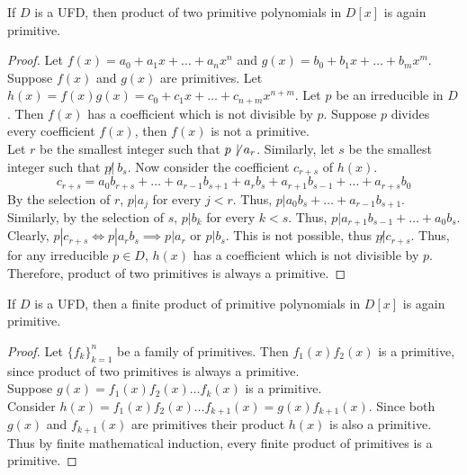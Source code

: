 \begin{lemma}[Gauss]
	If $D$ is a UFD, then product of two primitive polynomials in $D[x]$ is again primitive.
\end{lemma}
\begin{proof}
	Let $f(x) = a_0 + a_1x + \dots + a_nx^n$ and $g(x) = b_0 + b_1x + \dots + b_mx^m$.
	Suppose $f(x)$ and $g(x)$ are primitives.
	Let $h(x) = f(x)g(x) = c_0 + c_1x + \dots + c_{n+m}x^{n+m}$.
	Let $p$ be an irreducible in $D$.
	Then $f(x)$ has a coefficient which is not divisible by $p$.
	Suppose $p$ divides every coefficient $f(x)$, then $f(x)$ is not a primitive.\\

	Let $r$ be the smallest integer such that $p\not\!|\ a_r$.
	Similarly, let $s$ be the smallest integer such that $p\not|\ b_s$.
	Now consider the coefficient $c_{r+s}$ of $h(x)$.
	$$ c_{r+s} = a_0b_{r+s}+\dots+a_{r-1}b_{s+1}+a_rb_s+a_{r+1}b_{s-1}+\dots+a_{r+s}b_0$$
	By the selection of $r$, $p | a_j$ for every $j < r$.
	Thus, $p | a_0b_s+\dots+a_{r-1}b_{s+1}$.
	Similarly, by the selection of $s$, $p | b_k$ for every $k < s$.
	Thus, $p | a_{r+1}b_{s-1}+\dots+a_0b_s$.
	Clearly, $p | c_{r+s} \iff p | a_rb_s \implies p|a_r \text{ or } p|b_s$.
	This is not possible, thus $p \not| c_{r+s}$.	
	Thus, for any irreducible $p \in D$, $h(x)$ has a coefficient which is not divisible by $p$.
	Therefore, product of two primitives is always a primitive.
\end{proof}

\begin{corollary}
	If $D$ is a UFD, then a finite product of primitive polynomials in $D[x]$ is again primitive.
\end{corollary}
\begin{proof}
	Let $\{f_k\}_{k=1}^n$ be a family of primitives.
	Then $f_1(x)f_2(x)$ is a primitive, since product of two primitives is always a primitive.\\

	Suppose $g(x) = f_1(x)f_2(x)\dots f_k(x)$ is a primitive.\\

	Consider $h(x) = f_1(x)f_2(x)\dots f_{k+1}(x) = g(x)f_{k+1}(x)$.
	Since both $g(x)$ and $f_{k+1}(x)$ are primitives their product $h(x)$ is also a primitive.\\

	Thus by finite mathematical induction, every finite product of primitives is a primitive.
\end{proof}

